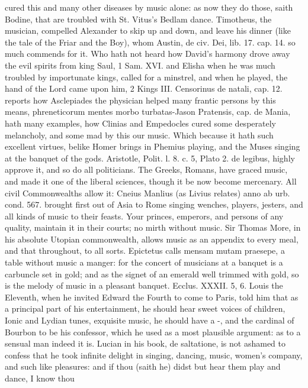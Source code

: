 {cured this and many other diseases by music alone: as now they do
those, saith Bodine, that are troubled with St. Vitus's Bedlam
dance. Timotheus, the musician, compelled Alexander to skip up
and down, and leave his dinner (like the tale of the Friar and the
Boy), whom Austin, de civ. Dei, lib. 17. cap. 14. so much commends for
it. Who hath not heard how David's harmony drove away the evil spirits
from king Saul, 1 Sam. XVI. and Elisha when he was much troubled by
importunate kings, called for a minstrel, and when he played, the hand
of the Lord came upon him, 2 Kings III. Censorinus de natali, cap. 12.
reports how Asclepiades the physician helped many frantic persons by
this means, phreneticorum mentes morbo turbatas-Jason Pratensis, cap.
de Mania, hath many examples, how Clinias and Empedocles cured some
desperately melancholy, and some mad by this our music. Which because
it hath such excellent virtues, belike Homer brings in Phemius
playing, and the Muses singing at the banquet of the gods. Aristotle,
Polit. l. 8. c. 5, Plato 2. de legibus, highly approve it, and so do
all politicians. The Greeks, Romans, have graced music, and made it one
of the liberal sciences, though it be now become mercenary. All civil
Commonwealths allow it: Cneius Manlius (as Livius relates) anno
ab urb. cond. 567. brought first out of Asia to Rome singing wenches,
players, jesters, and all kinds of music to their feasts. Your princes,
emperors, and persons of any quality, maintain it in their courts; no
mirth without music. Sir Thomas More, in his absolute Utopian
commonwealth, allows music as an appendix to every meal, and that
throughout, to all sorts. Epictetus calls mensam mutam praesepe, a
table without music a manger: for the concert of musicians at a banquet
is a carbuncle set in gold; and as the signet of an emerald well
trimmed with gold, so is the melody of music in a pleasant banquet.
Ecclus. XXXII. 5, 6. Louis the Eleventh, when he invited Edward
the Fourth to come to Paris, told him that as a principal part of his
entertainment, he should hear sweet voices of children, Ionic and
Lydian tunes, exquisite music, he should have a -, and the cardinal of
Bourbon to be his confessor, which he used as a most plausible
argument: as to a sensual man indeed it is.  Lucian in his book,
de saltatione, is not ashamed to confess that he took infinite delight
in singing, dancing, music, women's company, and such like pleasures:
and if thou (saith he) didst but hear them play and dance, I know thou
}
